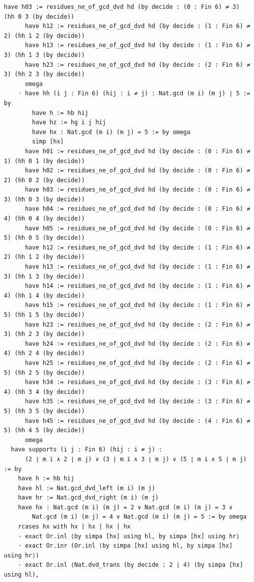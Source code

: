 \documentclass[11pt,a4paper]{article}
\begin{document}
\begin{Verbatim}[breaklines,breakanywhere,fontsize=\footnotesize]
      have h03 := residues_ne_of_gcd_dvd hd (by decide : (0 : Fin 6) ≠ 3) (hh 0 3 (by decide))
      have h12 := residues_ne_of_gcd_dvd hd (by decide : (1 : Fin 6) ≠ 2) (hh 1 2 (by decide))
      have h13 := residues_ne_of_gcd_dvd hd (by decide : (1 : Fin 6) ≠ 3) (hh 1 3 (by decide))
      have h23 := residues_ne_of_gcd_dvd hd (by decide : (2 : Fin 6) ≠ 3) (hh 2 3 (by decide))
      omega
    · have hh (i j : Fin 6) (hij : i ≠ j) : Nat.gcd (m i) (m j) ∣ 5 := by
        have h := hb hij
        have hz := hg i j hij
        have hx : Nat.gcd (m i) (m j) = 5 := by omega
        simp [hx]
      have h01 := residues_ne_of_gcd_dvd hd (by decide : (0 : Fin 6) ≠ 1) (hh 0 1 (by decide))
      have h02 := residues_ne_of_gcd_dvd hd (by decide : (0 : Fin 6) ≠ 2) (hh 0 2 (by decide))
      have h03 := residues_ne_of_gcd_dvd hd (by decide : (0 : Fin 6) ≠ 3) (hh 0 3 (by decide))
      have h04 := residues_ne_of_gcd_dvd hd (by decide : (0 : Fin 6) ≠ 4) (hh 0 4 (by decide))
      have h05 := residues_ne_of_gcd_dvd hd (by decide : (0 : Fin 6) ≠ 5) (hh 0 5 (by decide))
      have h12 := residues_ne_of_gcd_dvd hd (by decide : (1 : Fin 6) ≠ 2) (hh 1 2 (by decide))
      have h13 := residues_ne_of_gcd_dvd hd (by decide : (1 : Fin 6) ≠ 3) (hh 1 3 (by decide))
      have h14 := residues_ne_of_gcd_dvd hd (by decide : (1 : Fin 6) ≠ 4) (hh 1 4 (by decide))
      have h15 := residues_ne_of_gcd_dvd hd (by decide : (1 : Fin 6) ≠ 5) (hh 1 5 (by decide))
      have h23 := residues_ne_of_gcd_dvd hd (by decide : (2 : Fin 6) ≠ 3) (hh 2 3 (by decide))
      have h24 := residues_ne_of_gcd_dvd hd (by decide : (2 : Fin 6) ≠ 4) (hh 2 4 (by decide))
      have h25 := residues_ne_of_gcd_dvd hd (by decide : (2 : Fin 6) ≠ 5) (hh 2 5 (by decide))
      have h34 := residues_ne_of_gcd_dvd hd (by decide : (3 : Fin 6) ≠ 4) (hh 3 4 (by decide))
      have h35 := residues_ne_of_gcd_dvd hd (by decide : (3 : Fin 6) ≠ 5) (hh 3 5 (by decide))
      have h45 := residues_ne_of_gcd_dvd hd (by decide : (4 : Fin 6) ≠ 5) (hh 4 5 (by decide))
      omega
  have supports (i j : Fin 6) (hij : i ≠ j) :
      (2 ∣ m i ∧ 2 ∣ m j) ∨ (3 ∣ m i ∧ 3 ∣ m j) ∨ (5 ∣ m i ∧ 5 ∣ m j) := by
    have h := hb hij
    have hl := Nat.gcd_dvd_left (m i) (m j)
    have hr := Nat.gcd_dvd_right (m i) (m j)
    have hx : Nat.gcd (m i) (m j) = 2 ∨ Nat.gcd (m i) (m j) = 3 ∨
        Nat.gcd (m i) (m j) = 4 ∨ Nat.gcd (m i) (m j) = 5 := by omega
    rcases hx with hx | hx | hx | hx
    · exact Or.inl ⟨by simpa [hx] using hl, by simpa [hx] using hr⟩
    · exact Or.inr (Or.inl ⟨by simpa [hx] using hl, by simpa [hx] using hr⟩)
    · exact Or.inl ⟨Nat.dvd_trans (by decide : 2 ∣ 4) (by simpa [hx] using hl),

\end{Verbatim}
\end{document}
